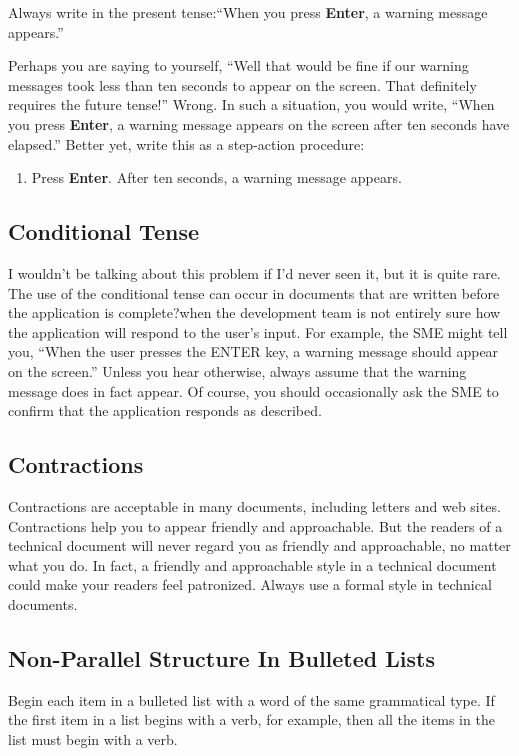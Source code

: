 \documentclass[12pt]{article}
\begin{document}
Always write in the present tense:``When you press \textbf{Enter}, a warning message appears.''

Perhaps you are saying to yourself, ``Well that would be fine if our warning messages took less than ten seconds to appear on the screen. That definitely requires the future tense!'' Wrong. In such a situation, you would write, ``When you press \textbf{Enter}, a warning message appears on the screen after ten seconds have elapsed.'' Better yet, write this as a step-action procedure:\\

\begin{enumerate} \itemsep -2pt
	\item Press \textbf{Enter}. After ten seconds, a warning message   appears.\\
\end{enumerate}

\subsection{Conditional Tense}
I wouldn't be talking about this problem if I'd never seen it, but it is quite rare. The use of the conditional tense can occur in documents that are written before the application is complete?when the development team is not entirely sure how the application will respond to the user's input. For example, the SME might tell you, ``When the user presses the ENTER key, a warning message should appear on the screen.'' Unless you hear otherwise, always assume that the warning message does in fact appear. Of course, you should occasionally ask the SME to confirm that the application responds as described.

\subsection{Contractions}
Contractions are acceptable in many documents, including letters and web sites. Contractions help you to appear friendly and approachable. But the readers of a technical document will never regard you as friendly and approachable, no matter what you do. In fact, a friendly and approachable style in a technical document could make your readers feel patronized. Always use a formal style in technical documents.

\subsection{Non-Parallel Structure In Bulleted Lists}
Begin each item in a bulleted list with a word of the same grammatical type. If the first item in a list begins with a verb, for example, then all the items in the list must begin with a verb.
\end{document}
